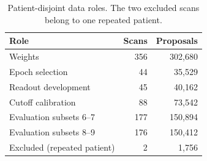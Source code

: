 \begin{table}[!t]
\centering
\footnotesize
\setlength{\tabcolsep}{4pt}
\small
\caption{Patient-disjoint data roles. The two excluded scans belong to one repeated patient.}
\label{tab:roles}
\begin{tabular}{@{}lrr@{}}
\toprule
Role & Scans & Proposals \\
\midrule
Weights & 356 & 302,680 \\
Epoch selection & 44 & 35,529 \\
Readout development & 45 & 40,162 \\
Cutoff calibration & 88 & 73,542 \\
Evaluation subsets 6--7 & 177 & 150,894 \\
Evaluation subsets 8--9 & 176 & 150,412 \\
Excluded (repeated patient) & 2 & 1,756 \\
\bottomrule
\end{tabular}
\end{table}
